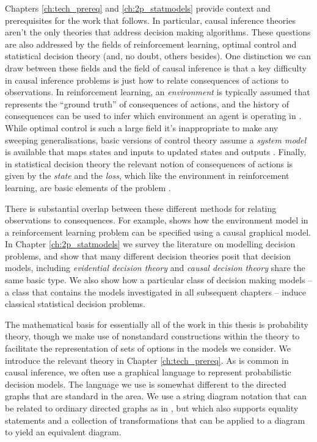 Chapters \ref{ch:tech_prereq} and \ref{ch:2p_statmodels} provide context and prerequisites for the work that follows. In particular, causal inference theories aren't the only theories that address decision making algorithms. These questions are also addressed by the fields of reinforcement learning, optimal control and statistical decision theory (and, no doubt, others besides). One distinction we can draw between these fields and the field of causal inference is that a key difficulty in causal inference problems is just how to relate consequences of actions to observations. In reinforcement learning, an \emph{environment} is typically assumed that represents the ``ground truth'' of consequences of actions, and the history of consequences can be used to infer which environment an agent is operating in \citep{barto_reinforcement_1998}. While optimal control is such a large field it's inappropriate to make any sweeping generalisations, basic versions of control theory assume a \emph{system model} is available that maps states and inputs to updated states and outputs \citep{ogata_discrete-time_1995}. Finally, in statistical decision theory the relevant notion of consequences of actions is given by the \emph{state} and the \emph{loss}, which like the environment in reinforcement learning, are basic elements of the problem \citep{wald_statistical_1950}.

There is substantial overlap between these different methods for relating observations to consequences. For example, \citet[Chap.~4]{lattimore_learning_2017} shows how the environment model in a reinforcement learning problem can be specified using a causal graphical model. In Chapter \ref{ch:2p_statmodels} we survey the literature on modelling decision problems, and show that many different decision theories posit that decision models, including \emph{evidential decision theory} and \emph{causal decision theory} share the same basic type. We also show how a particular class of decision making models -- a class that contains the models investigated in all subsequent chapters -- induce classical statistical decision problems.

The mathematical basis for essentially all of the work in this thesis is probability theory, though we make use of nonstandard constructions within the theory to facilitate the representation of sets of options in the models we consider. We introduce the relevant theory in Chapter \ref{ch:tech_prereq}. As is common in causal inference, we often use a graphical language to represent probabilistic decision models. The language we use is somewhat different to the directed graphs that are standard in the area. We use a string diagram notation that can be related to ordinary directed graphs as in \citep{fong_causal_2013}, but which also supports equality statements and a collection of transformations that can be applied to a diagram to yield an equivalent diagram.

